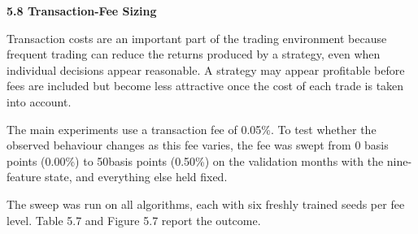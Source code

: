 \textbf{5.8 Transaction-Fee Sizing}

Transaction costs are an important part of the trading environment
because frequent trading can reduce the returns produced by a strategy,
even when individual decisions appear reasonable. A strategy may appear
profitable before fees are included but become less attractive once the
cost of each trade is taken into account.

The main experiments use a transaction fee of 0.05\%. To test whether
the observed behaviour changes as this fee varies, the fee was swept
from 0 basis points (0.00\%) to 50basis points (0.50\%) on the
validation months with the nine-feature state, and everything else held
fixed.

The sweep was run on all algorithms, each with six freshly trained seeds
per fee level. Table 5.7 and Figure 5.7 report the outcome.

